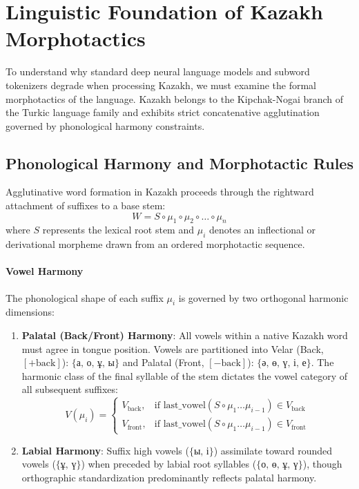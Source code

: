 \section{Linguistic Foundation of Kazakh Morphotactics}
\label{sec:linguistic_foundation}

To understand why standard deep neural language models and subword tokenizers degrade when processing Kazakh, we must examine the formal morphotactics of the language. Kazakh belongs to the Kipchak-Nogai branch of the Turkic language family and exhibits strict concatenative agglutination governed by phonological harmony constraints.

\subsection{Phonological Harmony and Morphotactic Rules}
Agglutinative word formation in Kazakh proceeds through the rightward attachment of suffixes to a base stem:
\begin{equation}
W = S \circ \mu_1 \circ \mu_2 \circ \dots \circ \mu_n
\end{equation}
where $S$ represents the lexical root stem and $\mu_i$ denotes an inflectional or derivational morpheme drawn from an ordered morphotactic sequence.

\paragraph{Vowel Harmony}
The phonological shape of each suffix $\mu_i$ is governed by two orthogonal harmonic dimensions:
\begin{enumerate}
    \item \textbf{Palatal (Back/Front) Harmony}: All vowels within a native Kazakh word must agree in tongue position. Vowels are partitioned into Velar (Back, $[+\text{back}]$): $\{\text{а, о, ұ, ы}\}$ and Palatal (Front, $[-\text{back}]$): $\{\text{ә, ө, ү, і, е}\}$. The harmonic class of the final syllable of the stem dictates the vowel category of all subsequent suffixes:
    \begin{equation}
    V(\mu_{i}) = \begin{cases}
    V_{\text{back}}, & \text{if } \mathrm{last\_vowel}(S \circ \mu_1 \dots \mu_{i-1}) \in V_{\text{back}} \\
    V_{\text{front}}, & \text{if } \mathrm{last\_vowel}(S \circ \mu_1 \dots \mu_{i-1}) \in V_{\text{front}}
    \end{cases}
    \end{equation}
    \item \textbf{Labial Harmony}: Suffix high vowels ($\{\text{ы, і}\}$) assimilate toward rounded vowels ($\{\text{ұ, ү}\}$) when preceded by labial root syllables ($\{\text{о, ө, ұ, ү}\}$), though orthographic standardization predominantly reflects palatal harmony.
\end{enumerate}

